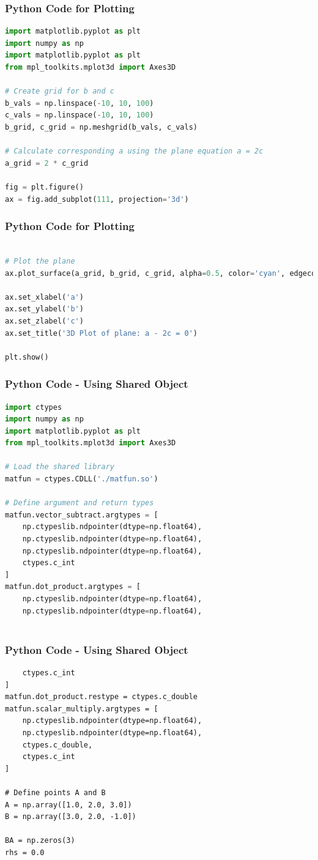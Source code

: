 \documentclass{beamer}
\numberwithin{equation}{section}
\begin{document}
\begin{frame}[fragile]
\frametitle{Python Code for Plotting}
\begin{lstlisting}[language=Python]
import matplotlib.pyplot as plt
import numpy as np
import matplotlib.pyplot as plt
from mpl_toolkits.mplot3d import Axes3D

# Create grid for b and c
b_vals = np.linspace(-10, 10, 100)
c_vals = np.linspace(-10, 10, 100)
b_grid, c_grid = np.meshgrid(b_vals, c_vals)

# Calculate corresponding a using the plane equation a = 2c
a_grid = 2 * c_grid

fig = plt.figure()
ax = fig.add_subplot(111, projection='3d')

\end{lstlisting}

\end{frame}
\begin{frame}[fragile]
\frametitle{Python Code for Plotting}
\begin{lstlisting}[language=Python]

# Plot the plane
ax.plot_surface(a_grid, b_grid, c_grid, alpha=0.5, color='cyan', edgecolor='k')

ax.set_xlabel('a')
ax.set_ylabel('b')
ax.set_zlabel('c')
ax.set_title('3D Plot of plane: a - 2c = 0')

plt.show()

\end{lstlisting}

\end{frame}
\begin{frame}[fragile]
\frametitle{Python Code - Using Shared Object}
\begin{lstlisting}[language=Python]
import ctypes
import numpy as np
import matplotlib.pyplot as plt
from mpl_toolkits.mplot3d import Axes3D

# Load the shared library
matfun = ctypes.CDLL('./matfun.so')

# Define argument and return types
matfun.vector_subtract.argtypes = [
    np.ctypeslib.ndpointer(dtype=np.float64),
    np.ctypeslib.ndpointer(dtype=np.float64),
    np.ctypeslib.ndpointer(dtype=np.float64),
    ctypes.c_int
]
matfun.dot_product.argtypes = [
    np.ctypeslib.ndpointer(dtype=np.float64),
    np.ctypeslib.ndpointer(dtype=np.float64),
    
\end{lstlisting}

\end{frame}
\begin{frame}[fragile]
    \frametitle{Python Code - Using Shared Object}
    \begin{lstlisting}
    ctypes.c_int
]
matfun.dot_product.restype = ctypes.c_double
matfun.scalar_multiply.argtypes = [
    np.ctypeslib.ndpointer(dtype=np.float64),
    np.ctypeslib.ndpointer(dtype=np.float64),
    ctypes.c_double,
    ctypes.c_int
]

# Define points A and B
A = np.array([1.0, 2.0, 3.0])
B = np.array([3.0, 2.0, -1.0])

BA = np.zeros(3)
rhs = 0.0
\end{lstlisting}
\end{frame}
\end{document}
